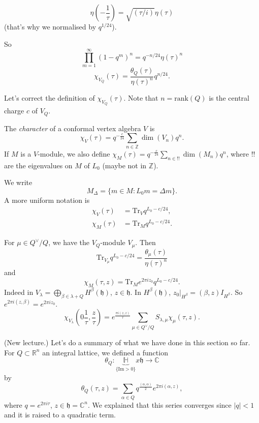 \begin{lemma}
\label{lemma-duplicate-2}
$$
\eta\left(-\frac{1}{\tau}\right)
=\sqrt{(\tau/i)}\eta(\tau)
$$
(that's why we normalised by $q^{1/24}$).
\end{lemma}

\noindent
So
$$
\prod_{m=1}^\infty (1-q^m)^n
=q^{-n/24}\eta(\tau)^n
$$
$$
\chi_{V_Q}(\tau)=\frac{\theta_Q(\tau)}
{\eta(\tau)^n}q^{n/24}.
$$

Let's correct the definition of
$\chi_{V_Q}(\tau)$.
Note that $n=\text{rank}(Q)$ is the central
charge $c$ of $V_Q$.

\begin{definition}
\label{definition-chara-confo-verte-algeb}
The {\it character} of a conformal vertex
algebra $V$ is
$$
\chi_V(\tau)=q^{-\frac{c}{24}}\sum_{n \in
\mathbb{Z}}\dim(V_n)q^n.
$$
If $M$ is a $V$-module,
we also define
$\chi_M(\tau)=q^{-\frac{c}{24}}\sum_{n\in!!}
\dim(M_n)q^n$,
where $!!$ are the eigenvalues on $M$ of
$L_0$ (maybe not in $\mathbb{Z}$).

We write
$$
M_\Delta=\{m \in M:L_0m=\Delta m\}.
$$
A more uniform notation is
$$
\begin{aligned}
\chi_V(\tau)&=\text{Tr}_Vq^{L_0-c/24},\\
\chi_M(\tau)&=\text{Tr}_Mq^{L_0-c/24}.
\end{aligned}
$$
\end{definition}

\begin{lemma}
\label{lemma-character-v-modules}
For $\mu \in Q^\vee/Q$, we have the
$V_Q$-module $V_\mu$.
Then
$$
\text{Tr}_{V_\mu}q^{L_0-c/24}=
\frac{\theta_\mu(\tau)}{\eta(\tau)^n}
$$
and
$$
\boxed{\chi_M(\tau,z)=\text{Tr}_Me^{2\pi
iz_0}q^{L_0-c/24}.}
$$
Indeed in
$V_\lambda=\bigoplus_{\beta\in\lambda+Q}
H^\beta(\mathfrak{h})$,
$z \in \mathfrak{h}$. In
$H^\beta(\mathfrak{h})$,
$z_0|_{H^\beta}=(\beta,z)I_{H^\beta}$.
So $e^{2\pi i(z,\beta)}=e^{2\pi i z_0}$.
$$
\chi_{V_\lambda}\left(0\frac{1}{\tau},
\frac{z}{\tau}\right)
=e^{\frac{\pi i(z,z)}{\tau}}
\sum_{\mu \in
Q^\vee/Q}S_{\lambda,\mu}\chi_\mu(\tau,z).
$$
\end{lemma}




\medskip\noindent
(New lecture.) Let's do a summary of what we
have done
in this section so far.
For $Q \subset \mathbb{R}^n$ an integral
lattice,
we defined a function
$$
\theta_Q:\underbrace{\mathbb{H}}_{\{\text{Im}
>0\}}x
\mathfrak{h} \to \mathbb{C}
$$
by
$$
\theta_Q(\tau,z)=\sum_{\alpha \in
Q}q^{\frac{(\alpha,\alpha)}{2}}
e^{2\pi i(\alpha,z)},
$$
where $q=e^{2\pi i \tau}$, $z \in
\mathfrak{h}=\mathbb{C}^n$.
We explained that this series converges since
$|q|<1$ and it
is raised to a quadratic term.

